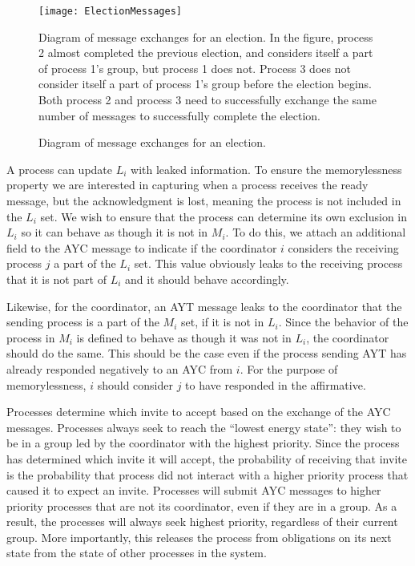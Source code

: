 \begin{figure}[]
\texttt{[image: ElectionMessages]}
\caption{Diagram of message exchanges for an election.}{Diagram of message exchanges for an election. In the figure, process 2 almost completed the previous election, and considers itself a part of process 1's group, but process 1 does not. Process 3 does not consider itself a part of process 1's group before the election begins. Both process 2 and process 3 need to successfully exchange the same number of messages to successfully complete the election.}
\label{fig:electionmessages}
\end{figure}

A process can update $L_i$ with leaked information.
To ensure the memorylessness property we are interested in capturing when a process receives the ready message, but the acknowledgment is lost, meaning the process is not included in the $L_i$ set.
We wish to ensure that the process can determine its own exclusion in $L_i$ so it can behave as though it is not in $M_i$.
To do this, we attach an additional field to the \ac{AYC} message to indicate if the coordinator $i$ considers the receiving process $j$ a part of the $L_i$ set.
This value obviously leaks to the receiving process that it is not part of $L_i$ and it should behave accordingly.

Likewise, for the coordinator, an \ac{AYT} message leaks to the coordinator that the sending process is a part of the $M_i$ set, if it is not in $L_i$.
Since the behavior of the process in $M_i$ is defined to behave as though it was not in $L_i$, the coordinator should do the same.
This should be the case even if the process sending \ac{AYT} has already responded negatively to an \ac{AYC} from $i$.
For the purpose of memorylessness, $i$ should consider $j$ to have responded in the affirmative.

Processes determine which invite to accept based on the exchange of the \ac{AYC} messages.
Processes always seek to reach the ``lowest energy state'': they wish to be in a group led by the coordinator with the highest priority.
Since the process has determined which invite it will accept, the probability of receiving that invite is the probability that process did not interact with a higher priority process that caused it to expect an invite.
Processes will submit AYC messages to higher priority processes that are not its coordinator, even if they are in a group.
As a result, the processes will always seek highest priority, regardless of their current group.
More importantly, this releases the process from obligations on its next state from the state of other processes in the system.

